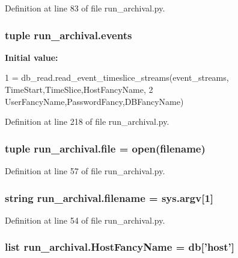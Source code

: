 Definition at line 83 of file run\-\_\-archival.\-py.

\hypertarget{namespacerun__archival_a46a929fd7b61c93a6bf4aa010103b238}{
\subsubsection[{events}]{\setlength{\rightskip}{0pt plus 5cm}tuple run\-\_\-archival.\-events}}\label{namespacerun__archival_a46a929fd7b61c93a6bf4aa010103b238}
{\bfseries Initial value\-:}
\begin{DoxyCode}
1 = db\_read.read\_event\_timeslice\_streams(event\_streams, TimeStart,TimeSlice,HostFancyName,
2                                     UserFancyName,PasswordFancy,DBFancyName)
\end{DoxyCode}


Definition at line 218 of file run\-\_\-archival.\-py.

\hypertarget{namespacerun__archival_a7dfbcbcaa557fe14b2d806be5becb9c8}{
\subsubsection[{file}]{\setlength{\rightskip}{0pt plus 5cm}tuple run\-\_\-archival.\-file = open({\bf filename})}}\label{namespacerun__archival_a7dfbcbcaa557fe14b2d806be5becb9c8}


Definition at line 57 of file run\-\_\-archival.\-py.

\hypertarget{namespacerun__archival_ad69d736434dc745a1e6b5ba5890edf45}{
\subsubsection[{filename}]{\setlength{\rightskip}{0pt plus 5cm}string run\-\_\-archival.\-filename = sys.\-argv\mbox{[}1\mbox{]}}}\label{namespacerun__archival_ad69d736434dc745a1e6b5ba5890edf45}


Definition at line 54 of file run\-\_\-archival.\-py.

\hypertarget{namespacerun__archival_ab5fa54210432cb72d27084b733c3cdc0}{
\subsubsection[{Host\-Fancy\-Name}]{\setlength{\rightskip}{0pt plus 5cm}list run\-\_\-archival.\-Host\-Fancy\-Name = {\bf db}\mbox{[}'host'\mbox{]}}}\label{namespacerun__archival_ab5fa54210432cb72d27084b733c3cdc0}


